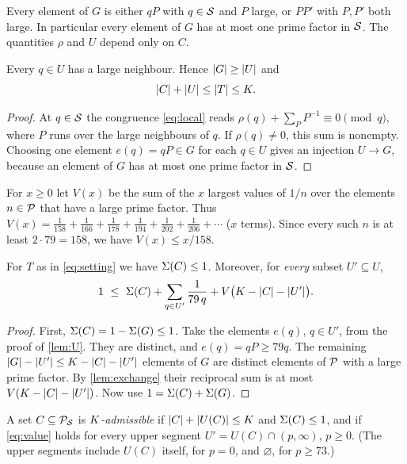 \documentclass[11pt]{article}
\begin{document}
Every element of $G$ is either $qP$ with $q\in\mathcal{S}$ and $P$ large, or $PP'$ with $P,P'$ both large.
In particular every element of $G$ has at most one prime factor in $\mathcal{S}$.
The quantities $\rho$ and $U$ depend only on $C$.

\begin{lemma}\label{lem:U}
Every $q\in U$ has a large neighbour. Hence $\lvert G\rvert\ge\lvert U\rvert$ and
\[
\lvert C\rvert+\lvert U\rvert\le\lvert T\rvert\le K .
\]
\end{lemma}

\begin{proof}
At $q\in\mathcal{S}$ the congruence \eqref{eq:local} reads $\rho(q)+\sum_{P}P^{-1}\equiv0\pmod q$, where $P$ runs over the large neighbours of $q$. If $\rho(q)\ne0$, this sum is nonempty. Choosing one element $e(q)=qP\in G$ for each $q\in U$ gives an injection $U\to G$, because an element of $G$ has at most one prime factor in $\mathcal{S}$.
\end{proof}

For $x\ge0$ let $V(x)$ be the sum of the $x$ largest values of $1/n$ over the elements $n\in\mathcal{P}$ that have a large prime factor. Thus
$V(x)=\tfrac1{158}+\tfrac1{166}+\tfrac1{178}+\tfrac1{194}+\tfrac1{202}+\tfrac1{206}+\cdots$ ($x$ terms).
Since every such $n$ is at least $2\cdot79=158$, we have $V(x)\le x/158$.

\begin{lemma}\label{lem:value}
For $T$ as in \eqref{eq:setting} we have $\Sigma(C)\le1$. Moreover, for \emph{every} subset $U'\subseteq U$,
\begin{equation}\label{eq:value}
1\ \le\ \Sigma(C)+\sum_{q\in U'}\frac1{79\,q}+V\bigl(K-\lvert C\rvert-\lvert U'\rvert\bigr).
\end{equation}
\end{lemma}

\begin{proof}
First, $\Sigma(C)=1-\Sigma(G)\le1$.
Take the elements $e(q)$, $q\in U'$, from the proof of \cref{lem:U}. They are distinct, and $e(q)=qP\ge79q$.
The remaining $\lvert G\rvert-\lvert U'\rvert\le K-\lvert C\rvert-\lvert U'\rvert$ elements of $G$ are distinct elements of $\mathcal{P}$ with a large prime factor.
By \cref{lem:exchange} their reciprocal sum is at most $V(K-\lvert C\rvert-\lvert U'\rvert)$.
Now use $1=\Sigma(C)+\Sigma(G)$.
\end{proof}

\begin{definition}\label{def:admissible}
A set $C\subseteq\mathcal{P}_{\mathcal{S}}$ is \emph{$K$-admissible} if $\lvert C\rvert+\lvert U(C)\rvert\le K$ and $\Sigma(C)\le1$, and if \eqref{eq:value} holds for every upper segment $U'=U(C)\cap(p,\infty)$, $p\ge0$. (The upper segments include $U(C)$ itself, for $p=0$, and $\varnothing$, for $p\ge73$.)
\end{definition}
\end{document}
